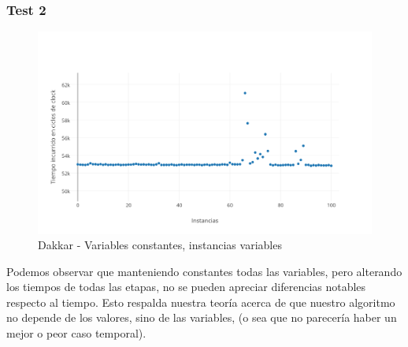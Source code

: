 \vspace*{0.3cm}

\vspace*{0.6cm}

\subsubsection{Test 2}

\begin{figure}[htb]
	\begin{center}
    		\includegraphics[scale=0.5]{imagenes/1C.png}
	\end{center}
	\caption{Dakkar - Variables constantes, instancias variables}\label{fig:1D}
\end{figure}

Podemos observar que manteniendo constantes todas las variables, pero alterando los tiempos de todas las etapas, no se pueden apreciar diferencias notables respecto al tiempo. Esto respalda nuestra teoría acerca de que nuestro algoritmo no depende de los valores, sino de las variables, (o sea que no parecería haber un mejor o peor caso temporal).